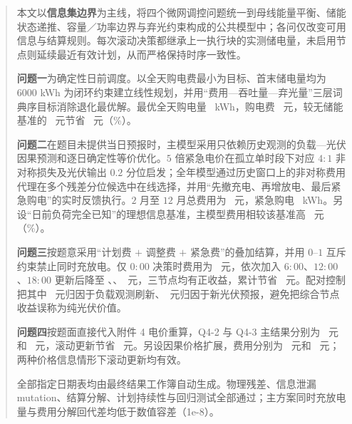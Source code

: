\maketitle%
\thispagestyle{plain}%
\begin{abstract}%

	本文以\textbf{信息集边界}为主线，将四个微网调控问题统一到母线能量平衡、储能状态递推、容量／功率边界与弃光约束构成的公共模型中；各问仅改变可用信息与结算规则。每次滚动决策都继承上一执行块的实测储电量，未启用节点则延续最近有效计划，从而严格保持时序一致性。

	\textbf{问题一}为确定性日前调度。以全天购电费最小为目标、首末储电量均为 $6000$ kWh 为闭环约束建立线性规划，并用“费用—吞吐量—弃光量”三层词典序目标消除退化最优解。最优全天购电量 \QoneEnergy\ kWh，购电费 \QoneCost\ 元，较无储能基准的 \QoneNoStorage\ 元节省 \QoneSave\ 元（\QoneSavePct\%）。

	\textbf{问题二}在题目未提供当日预报时，主模型采用只依赖历史观测的负载—光伏因果预测和逐日确定性等价优化。$5$ 倍紧急电价在孤立单时段下对应 $4:1$ 非对称损失及光伏输出 $0.2$ 分位启发；全年模型通过历史窗口上的非对称费用代理在多个残差分位候选中在线选择，并用“先撤充电、再增放电、最后紧急购电”的实时反馈执行。$2$ 月至 $12$ 月总费用为 \QtwoTotal\ 元，紧急购电 \QtwoEmergency\ kWh。另设“日前负荷完全已知”的理想信息基准，主模型费用相较该基准高 \DeltaLoad\ 元（\DeltaLoadPct\%）。

	\textbf{问题三}按题意采用“计划费 $+$ 调整费 $+$ 紧急费”的叠加结算，并用 $0$--$1$ 互斥约束禁止同时充放电。仅 $0{:}00$ 决策时费用为 \QthreeSzero\ 元，依次加入 $6{:}00$、$12{:}00$、$18{:}00$ 更新后降至 \QthreeSone、\QthreeStwo、\QthreeSthree\ 元，三节点均有正收益，累计节省 \QthreeVtotal\ 元。配对控制把其中 \QthreeLoadTotal\ 元归因于负载观测刷新、\QthreePvTotal\ 元归因于新光伏预报，避免把综合节点收益误称为纯光伏价值。

	\textbf{问题四}按题面直接代入附件 4 电价重算，Q4-2 与 Q4-3 主结果分别为 \QfourTwoMain\ 元和 \QfourThreeMain\ 元，滚动更新节省 \QfourRollPerfect\ 元。另设因果价格扩展，费用分别为 \QfourTwoCausal\ 元和 \QfourThreeCausal\ 元；两种价格信息情形下滚动更新均有效。

	全部指定日期表均由最终结果工作簿自动生成。物理残差、信息泄漏 mutation、结算分解、计划持续性与回归测试全部通过；主方案同时充放电量与费用分解回代差均低于数值容差（1e-8）。

\end{abstract}
